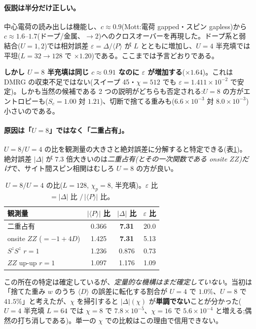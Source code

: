 \documentclass[11pt,a4paper]{ltjsarticle}
\newcommand{\ev}[1]{\langle #1\rangle}
\begin{document}
\paragraph{仮説は半分だけ正しい。}中心電荷の読み出しは機能し、$c\approx0.9$(Mott:電荷 gapped・スピン gapless)から $c\approx1.6$--$1.7$(ドープ/金属、$\to2$)へのクロスオーバーを再現した。ドープ系と弱結合($U=1,2$)では相対誤差 $\varepsilon=\Delta/\ev{P}$ が $L$ とともに増加し、$U=4$ 半充填では平坦($L=32\to128$ で $\times1.20$)である。ここまでは予言どおりである。

\textbf{しかし $U=8$ 半充填は同じ $c\approx0.91$ なのに $\varepsilon$ が増加する}($\times1.64$)。これは DMRG の収束不足ではない(スイープ 45・$\chi=512$ でも $\varepsilon=1.411\times10^{-2}$ で安定)。しかも当然の候補である 2 つの説明がどちらも否定される:$U=8$ の方がエントロピーも($S_c=1.00$ 対 $1.21$)、切断で捨てる重みも($6.6\times10^{-3}$ 対 $8.0\times10^{-3}$)小さいのである。

\paragraph{原因は「$U=8$」ではなく「二重占有」。}$U=8/U=4$ の比を観測量の大きさと絶対誤差に分解すると特定できる(表\ref{tab:u8decomp})。絶対誤差 $|\Delta|$ が $7.3$ 倍大きいのは\emph{二重占有(とその一次関数である onsite $ZZ$)だけ}で、サイト間スピン相関はむしろ $U=8$ の方が良い。

\begin{table}[t]
\centering\small
\caption{$U=8/U=4$ の比($L=128$, $\chi_p=8$, 半充填)。$\varepsilon$ 比 $=|\Delta|$ 比 $/\,|\ev{P}|$ 比。}
\label{tab:u8decomp}
\begin{tabular}{@{}lccc@{}}
\toprule
観測量 & $|\ev{P}|$ 比 & $|\Delta|$ 比 & $\varepsilon$ 比 \\
\midrule
二重占有            & 0.366 & \textbf{7.31} & 20.0 \\
onsite $ZZ$ ($=-1+4D$) & 1.425 & \textbf{7.31} & 5.13 \\
$S^zS^z$ $r{=}1$    & 1.236 & 0.876 & 0.73 \\
$ZZ$ up-up $r{=}1$  & 1.097 & 1.176 & 1.09 \\
\bottomrule
\end{tabular}
\end{table}

この所在の特定は確定しているが、\emph{定量的な機構はまだ確定していない}。当初は「捨てた重み $w$ のうち $\ev{D}$ の誤差に転化する割合が $U=4$ で $1.0\%$、$U=8$ で $41.5\%$」と考えたが、$\chi$ を掃引すると $|\Delta|(\chi)$ が\textbf{単調でない}ことが分かった($U=4$ 半充填 $L=64$ では $\chi=8$ で $7.8\times10^{-5}$、$\chi=16$ で $5.6\times10^{-4}$ と増える;偶然の打ち消しである)。単一の $\chi$ での比較はこの理由で信用できない。
\end{document}
